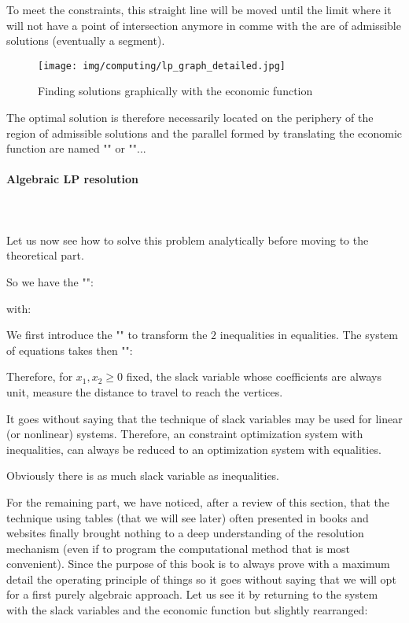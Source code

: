 	To meet the constraints, this straight line will be moved until the limit where it will not have a point of intersection anymore in comme with the are of admissible solutions (eventually a segment).
	\begin{figure}[H]
		\centering
		\texttt{[image: img/computing/lp\_graph\_detailed.jpg]}
		\caption{Finding solutions graphically with the economic function}
	\end{figure}
	The optimal solution is therefore necessarily located on the periphery of the region of admissible solutions and the parallel formed by translating the economic function are named "" or ""...
		
	\paragraph{Algebraic LP resolution}\mbox{}\\\\	
	Let us now see how to solve this problem analytically before moving to the theoretical part.
	
	So we have the "":
	
	with:
	
	We first introduce the "" to transform the $2$ inequalities in equalities. The system of equations takes then "":
	
	Therefore, for $x_1,x_2\geq 0$ fixed, the slack variable whose coefficients are always unit, measure the distance to travel to reach the vertices.

	It goes without saying that the technique of slack variables may be used for linear (or nonlinear) systems. Therefore, an constraint optimization system with inequalities, can always be reduced to an optimization system with equalities.
	\begin{tcolorbox}[title=Remark,colframe=black,arc=10pt]
	Obviously there is as much slack variable as inequalities.
	\end{tcolorbox}
	For the remaining part, we have noticed, after a review of this section, that the technique using tables (that we will see later) often presented in books and websites finally brought nothing to a deep understanding of the resolution mechanism (even if to program the computational method that is most convenient). Since the purpose of this book is to always prove with a maximum detail the operating principle of things so it goes without saying that we will opt for a first purely algebraic approach. Let us see it by returning to the system with the slack variables and the economic function but slightly rearranged:
	
